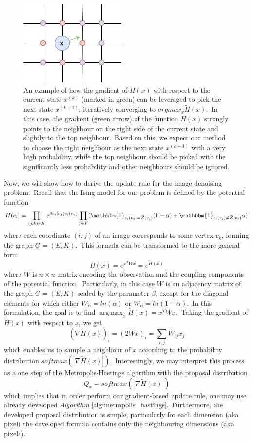 \documentclass[shortabstract, english, lic]{iithesis}
\DeclareMathOperator*{\argmax}{arg\,max}
\theoremstyle{default_theorem_style}\newtheorem{theorem}{Theorem}
\theoremstyle{default_theorem_style}\newtheorem{definition}{Definition}
\begin{document}
\begin{figure}[t]
\centering
\includegraphics[scale=0.9]{gradient_example}
\caption{An example of how the gradient of $\tilde{H}(x)$ with respect to the current state $x^{(k)}$ (marked in green)
can be leveraged to pick the next state $x^{(k + 1)}$, iteratively converging to $argmax_x \tilde{H}(x)$.\ In this
case, the gradient (green arrow) of the function $\tilde{H}(x)$ strongly points to the neighbour on the right side
of the current state and slightly to the top neighbour.\ Based on this, we expect our method to choose the right
neighbour as the next state $x^{(k + 1)}$ with a very high probability, while the top neighbour should be picked with
the significantly less probability and other neighbours should be ignored.}
\label{fig:gradient_example}
\end{figure}

\noindent Now, we will show how to derive the update rule for the image denoising problem.\ Recall that the Ising model
for our problem is defined by the potential function
$$
H(e_i) = \prod\limits_{(j, k) \in K} e^{\beta e_i(v_j)e_i(v_k)}
\prod\limits_{j \in V}( \mathbbm{1}_{e_i(v_j) = \tilde{Z}(v_j)}(1 - \alpha) +
\mathbbm{1}_{e_i(v_j) \neq \tilde{Z}(v_j)}\alpha)
$$
where each coordinate $(i, j)$ of an image corresponds to some vertex $v_k$, forming the graph $G = (E, K)$.\ This
formula can be transformed to the more general form
$$
H(x) = e^{x^T W x} = e^{\tilde{H}(x)}
$$
where $W$ is $n \times n$ matrix encoding the observation and the coupling components of the potential
function.\ Particularly, in this case $W$ is an adjacency matrix of the graph $G = (E, K)$ scaled by the parameter
$\beta$, except for the diagonal elements for which either $W_{ii} = ln(\alpha)$ or $W_{ii} = ln(1 - \alpha)$.\ In
this formulation, the goal is to find $\argmax_x \tilde{H}(x) = x^T W x$.\ Taking the gradient of
$\tilde{H}(x)$ with respect to $x$, we get
$$
(\nabla \tilde{H}(x))_i = (2W x)_i = \sum_{i, j} W_{ij} x_j
$$
which enables us to sample a neighbour of $x$ according to the probability distribution
$softmax(|\nabla \tilde{H}(x)|)$.\ Interestingly, we may interpret this process as a one step of the
Metropolis-Hastings algorithm with the proposal distribution
$$
Q_x = softmax(|\nabla \tilde{H}(x)|)
$$
which implies that in order perform our gradient-based update rule, one may use already developed
\textit{Algorithm} \ref{alg:metropolis_hastings}.\ Furthermore, the developed proposal distribution is simple,
particularly for each dimension (aka pixel) the developed formula contains only the neighbouring
dimensions (aka pixels).
\end{document}
